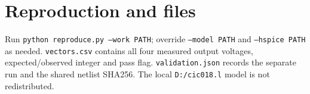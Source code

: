 \documentclass[10pt,a4paper]{article}
\begin{document}
\section*{Reproduction and files}
Run \texttt{python reproduce.py --work PATH}; override \texttt{--model PATH}
and \texttt{--hspice PATH} as needed. \texttt{vectors.csv} contains all
four measured output voltages, expected/observed integer and pass flag.
\texttt{validation.json} records the separate run and the shared netlist
SHA256. The local \texttt{D:/cic018.l} model is not redistributed.
\end{document}
